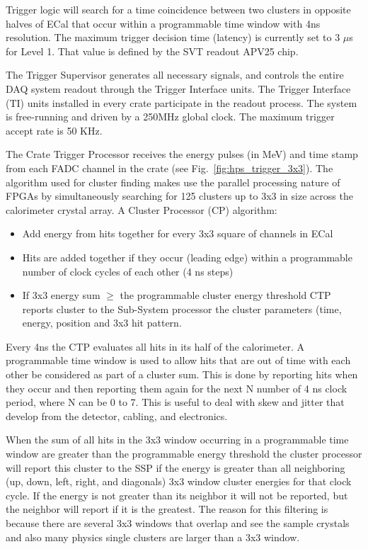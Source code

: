 Trigger logic will search for a time coincidence between two clusters in opposite halves of ECal that occur within a programmable time window with 4ns resolution. The maximum trigger decision time (latency) is currently set to 3 $\mu$s for Level 1. That value is defined by the SVT readout APV25 chip.

The Trigger Supervisor generates all necessary signals, and controls the entire DAQ system readout through the Trigger Interface units. The Trigger Interface (TI) units installed in every crate participate in the readout process. The system is free-running and driven by a 250MHz global clock. The maximum trigger accept rate is 50 KHz.




The Crate Trigger Processor receives the energy pulses (in MeV) and time stamp from each FADC channel in the crate (see Fig.~\ref{fig:hps_trigger_3x3}).
The algorithm used for cluster finding makes use the parallel processing nature of FPGAs by simultaneously searching for 125 clusters up to 3x3 in size across the calorimeter crystal array.  
A Cluster Processor (CP) algorithm:

\begin{itemize}
\item Add energy from hits together for every 3x3 square of channels in ECal
\item Hits are added together if they occur (leading edge) within a programmable number of clock cycles of each other (4 ns steps)
\item If 3x3 energy sum $\ge$  the programmable cluster energy threshold CTP reports cluster to the Sub-System processor the cluster parameters (time, energy, position and 3x3 hit pattern. 
\end{itemize}

Every 4ns the CTP evaluates all hits in its half of the calorimeter. A programmable time window is used to allow hits that are out of time with each other be considered as part of a cluster sum. This is done by reporting hits when they occur and then reporting them again for the next N number of 4 ns clock period, where N can be 0 to 7. This is useful to deal with skew and jitter that develop from the detector, cabling, and electronics.

When the sum of all hits in the 3x3 window occurring in a programmable time window are greater than the programmable energy threshold the cluster processor will report this cluster to the SSP if the energy is greater than all neighboring (up, down, left, right, and diagonals) 3x3 window cluster energies for that clock cycle. If the energy is not greater than its neighbor it will not be reported, but the neighbor will report if it is the greatest. The reason for this filtering is because there are several 3x3 windows that overlap and see the sample crystals and also many physics single clusters are larger than a 3x3 window.


